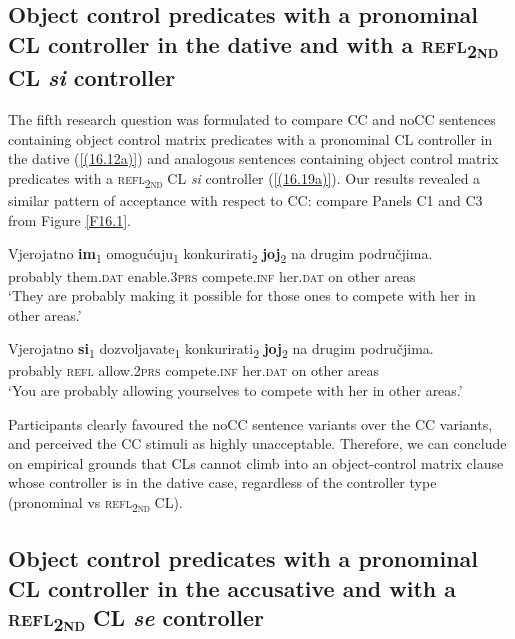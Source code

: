 \subsection{Object control predicates with a pronominal CL controller in the dative and with a \textsc{refl\textsubscript{2nd}} CL \textit{si} controller}
\label{Object control predicates with a pronominal CL controller in the dative and with a refl2nd CL si controller}
The fifth research question was formulated to compare CC and noCC sentences containing object control matrix predicates with a pronominal CL controller in the dative (\ref{(16.12a)}) and analogous sentences containing object control matrix predicates with a \textsc{refl\textsubscript{2nd}} CL \textit{si} controller (\ref{(16.19a)}). Our results revealed a similar pattern of acceptance with respect to CC: compare Panels C1 and C3 from Figure \ref{F16.1}. 

\begin{exe}
\gll Vjerojatno \textbf{im}\textsubscript{1} omogućuju\textsubscript{1} konkurirati\textsubscript{2} \textbf{joj}\textsubscript{2} na drugim područjima. \\
 probably them.\textsc{dat} enable.3\textsc{prs} compete.\textsc{inf} her.\textsc{dat} on other areas\\
\glt ‘They are probably making it possible for those ones to compete with her in other areas.’

\gll Vjerojatno \textbf{si}\textsubscript{1} dozvoljavate\textsubscript{1} konkurirati\textsubscript{2} \textbf{joj}\textsubscript{2} na drugim područjima.\\
 probably \textsc{refl} allow.2\textsc{prs} compete.\textsc{inf} her.\textsc{dat} on other areas\\
\glt ‘You are probably allowing yourselves to compete with her in other areas.’ 
\end{exe}


\noindent Participants clearly favoured the noCC sentence variants over the CC variants, and perceived the CC stimuli as highly unacceptable. Therefore, we can conclude on empirical grounds that CLs cannot climb into an object-control matrix clause whose controller is in the dative case, regardless of the controller type (pronominal vs \textsc{refl\textsubscript{2nd}} CL). 

\subsection{Object control predicates with a pronominal CL controller in the accusative and with a \textsc{refl\textsubscript{2nd}} CL \textit{se} controller}
\label{Object control predicates with a pronominal CL controller in the accusative and with a refl2nd CL se controller}

